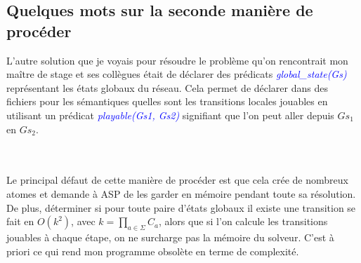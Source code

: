 \documentclass[12pt,a4paper]{article}
\begin{document}
\subsection{Quelques mots sur la seconde manière de procéder}
\hypertarget{partie4.4}{
L'autre solution que je voyais pour résoudre le problème qu'on rencontrait mon maître de stage et ses collègues était de déclarer des prédicats \emph{\textcolor{blue}{global\_state(Gs)}} représentant les états globaux du réseau. 
Cela permet de déclarer dans des fichiers pour les sémantiques quelles sont les transitions locales jouables en utilisant un prédicat \emph{\textcolor{blue}{playable(Gs1, Gs2)}} signifiant que l'on peut aller depuis 
$Gs_1$ en $Gs_2$.}\\ \\
Le principal défaut de cette manière de procéder est que cela crée de nombreux atomes et demande à ASP de les garder en mémoire pendant toute sa résolution. De plus, déterminer si pour toute paire d'états globaux il existe une 
transition se fait en $O(k^2)$, avec $k=\displaystyle{\prod_{a\in\Sigma}C_a}$, alors que si l'on calcule les transitions jouables à chaque étape, on ne surcharge pas la mémoire du solveur. C'est à priori ce qui rend mon programme 
obsolète en terme de complexité.

\newpage
\end{document}
